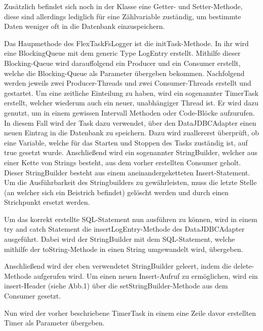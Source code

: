 Zusätzlich befindet sich noch in der Klasse eine Getter- und Setter-Methode, diese sind allerdings lediglich für eine Zählvariable zuständig, um bestimmte Daten weniger oft in die Datenbank einzuspeichern.

Das Haupmethode des FlexTaskFsLogger ist die initTask-Methode. In ihr wird eine BlockingQueue mit dem generic Type LogEntry erstellt. Mithilfe dieser Blocking-Queue wird darauffolgend ein Producer und ein Consumer erstellt, welche die Blocking-Queue als Parameter übergeben bekommen. Nachfolgend werden jeweils zwei Producer-Threads und zwei Consumer-Threads erstellt und gestartet. Um eine zeitliche Einteilung zu haben, wird ein sogenannter TimerTask erstellt, welcher wiederum auch ein neuer, unabhängiger Thread ist. Er wird dazu genutzt, um in einem gewissen Intervall Methoden oder Code-Blöcke aufzurufen. In diesem Fall wird der Task dazu verwendet, über den DataJDBCAdapter einen neuen Eintrag in die Datenbank zu speichern. Dazu wird zuallererst überprüft, ob eine Variable, welche für das Starten und Stoppen des Tasks zuständig ist, auf true gesetzt wurde. Anschließend wird ein sogenannter StringBuilder, welcher aus einer Kette von Strings besteht, aus dem vorher erstellten Consumer geholt. Dieser StringBuilder besteht aus einem aneinandergeketteten Insert-Statement. Um die Ausführbarkeit des Stringbuilders zu gewährleisten, muss die letzte Stelle (an welcher sich ein Beistrich befindet) gelöscht werden und durch einen Strichpunkt ersetzt werden. 

Um das korrekt erstellte SQL-Statement nun ausführen zu können, wird in einem try and catch Statement die insertLogEntry-Methode des DataJDBCAdapter ausgeführt. Dabei wird der StringBuilder mit dem SQL-Statement, welche mithilfe der toString-Methode in einen String umgewandelt wird, übergeben. 

Anschließend wird der eben verwendetet StringBuilder geleert, indem die delete-Methode aufgerufen wird. Um einen neuen Insert-Aufruf zu ermöglichen, wird ein insert-Header (siehe Abb.1) über die setStringBuilder-Methode aus dem Consumer gesetzt. 

Nun wird der vorher beschriebene TimerTask in einem eine Zeile davor erstellten Timer als Parameter übergeben.

